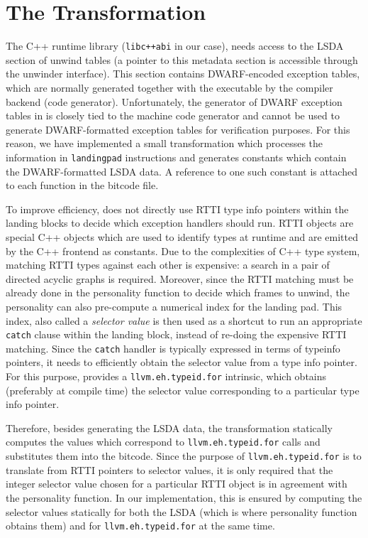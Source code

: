 \section{The \llvm{} Transformation}\label{sec:transform}

The C++ runtime library (\texttt{libc++abi} in our case), needs access
to the LSDA section of unwind tables (a pointer to this metadata section
is accessible through the unwinder interface). This section contains
DWARF-encoded exception tables, which are normally generated together
with the executable by the compiler backend (code generator).
Unfortunately, the generator of DWARF exception tables in \llvm{} is
closely tied to the machine code generator and cannot be used to
generate DWARF-formatted exception tables for verification purposes. For
this reason, we have implemented a small \llvm{} transformation which
processes the information in \texttt{landingpad} instructions and
generates \llvm{} constants which contain the DWARF-formatted LSDA data. A
reference to one such constant is attached to each function in the
bitcode file.

To improve efficiency, \llvm{} does not directly use RTTI type info
pointers within the landing blocks to decide which exception handlers
should run. RTTI objects are special C++ objects which are used to
identify types at runtime and are emitted by the C++ frontend as
constants. Due to the complexities of C++ type system, matching RTTI
types against each other is expensive: a search in a pair of directed
acyclic graphs is required. Moreover, since the RTTI matching must be
already done in the personality function to decide which frames to
unwind, the personality can also pre-compute a numerical index for the
landing pad. This index, also called a \emph{selector value} is then
used as a shortcut to run an appropriate \texttt{catch} clause within
the landing block, instead of re-doing the expensive RTTI matching.
Since the \texttt{catch} handler is typically expressed in terms of
typeinfo pointers, it needs to efficiently obtain the selector value
from a type info pointer. For this purpose, \llvm{} provides a
\texttt{llvm.eh.typeid.for} intrinsic, which obtains (preferably at
compile time) the selector value corresponding to a particular type info
pointer.

Therefore, besides generating the LSDA data, the transformation
statically computes the values which correspond to
\texttt{llvm.eh.typeid.for} calls and substitutes them into the bitcode.
Since the purpose of \texttt{llvm.eh.typeid.for} is to translate from
RTTI pointers to selector values, it is only required that the integer
selector value chosen for a particular RTTI object is in agreement with
the personality function. In our implementation, this is ensured by
computing the selector values statically for both the LSDA (which is
where personality function obtains them) and for
\texttt{llvm.eh.typeid.for} at the same time.

